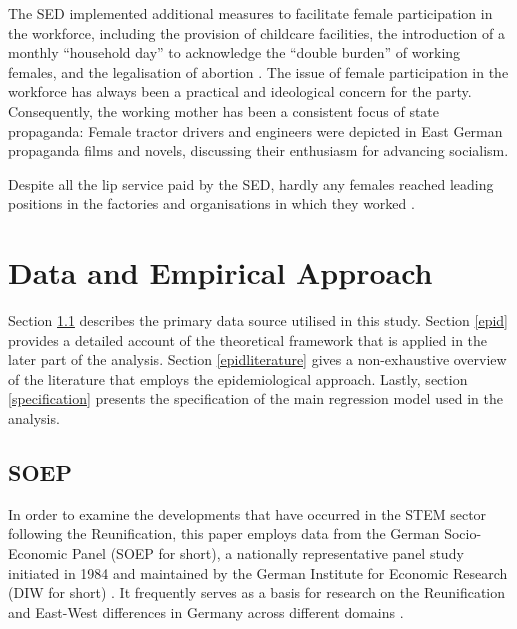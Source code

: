 \documentclass[a4paper, oneside, hyperfootnotes = false]{article}
\begin{document}
{%
The SED implemented additional measures to facilitate female participation in the workforce, including the provision of childcare facilities, the introduction of a monthly ``household day'' to acknowledge the ``double burden'' of working females, and the legalisation of abortion \citep{Budde1999}.
The issue of female participation in the workforce has always been a practical and ideological concern for the party.
Consequently, the working mother has been a consistent focus of state propaganda:
Female tractor drivers and engineers were depicted in East German propaganda films and novels, discussing their enthusiasm for advancing socialism.

Despite all the lip service paid by the SED, hardly any females reached leading positions in the factories and organisations in which they worked \citep{Ross2017, Frauenreport1990}.

\section{Data and Empirical Approach}
\label{dataemp}

Section \ref{gsoep} describes the primary data source utilised in this study.
Section \ref{epid} provides a detailed account of the theoretical framework that is applied in the later part of the analysis.
Section \ref{epidliterature} gives a non-exhaustive overview of the literature that employs the epidemiological approach.
Lastly, section \ref{specification} presents the specification of the main regression model used in the analysis.

\subsection{SOEP}
\label{gsoep}

In order to examine the developments that have occurred in the STEM sector following the Reunification, this paper employs data from the German Socio-Economic Panel (SOEP for short), a nationally representative panel study initiated in 1984 and maintained by the German Institute for Economic Research (DIW for short) \citep{Siegers2022}.
It frequently serves as a basis for research on the Reunification and East-West differences in Germany across different domains \citep{Petrunyk2016, Bird1994, Hadjar2010}.

}
\end{document}
